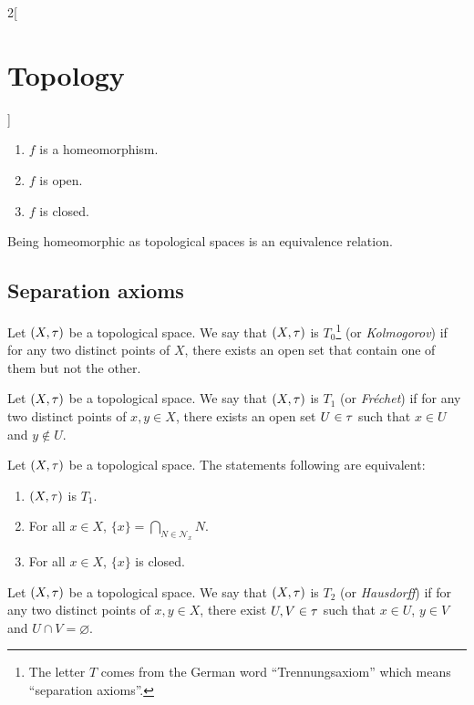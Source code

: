 \documentclass[../../../main.tex]{subfiles}
\begin{document}
\begin{multicols}{2}[\section{Topology}]
\begin{prop}
        \begin{enumerate}
            \item $f$ is a homeomorphism.
            \item $f$ is open.
            \item $f$ is closed.
        \end{enumerate}
    \end{prop}
    \begin{prop}
        Being homeomorphic as topological spaces is an equivalence relation.
    \end{prop}
    \subsection{Separation axioms}
    \begin{definition}[$T_0$ space]
        Let $(X,\tau)$ be a topological space. We say that $(X,\tau)$ is $T_0$\footnote{The letter $T$ comes from the German word ``Trennungsaxiom'' which means ``separation axioms''.} (or \emph{Kolmogorov}) if for any two distinct points of $X$, there exists an open set that contain one of them but not the other.
    \end{definition}
    \begin{definition}[$T_1$ space]
        Let $(X,\tau)$ be a topological space. We say that $(X,\tau)$ is $T_1$ (or \emph{Fréchet}) if for any two distinct points of $x,y\in X$, there exists an open set $U\in\tau$ such that $x\in U$ and $y\notin U$.
    \end{definition}
    \begin{theorem}
        Let $(X,\tau)$ be a topological space. The statements following are equivalent:
        \begin{enumerate}
            \item $(X,\tau)$ is $T_1$.
            \item For all $x\in X$, $\{x\}=\bigcap_{N\in \mathcal{N}_x}N$.
            \item For all $x\in X$, $\{x\}$ is closed.
        \end{enumerate}
    \end{theorem}
    \begin{definition}[$T_2$ space]
        Let $(X,\tau)$ be a topological space. We say that $(X,\tau)$ is $T_2$ (or \emph{Hausdorff}) if for any two distinct points of $x,y\in X$, there exist $U,V\in\tau$ such that $x\in U$, $y\in V$ and $U\cap V=\varnothing$.
    \end{definition}

\end{multicols}
\end{document}
